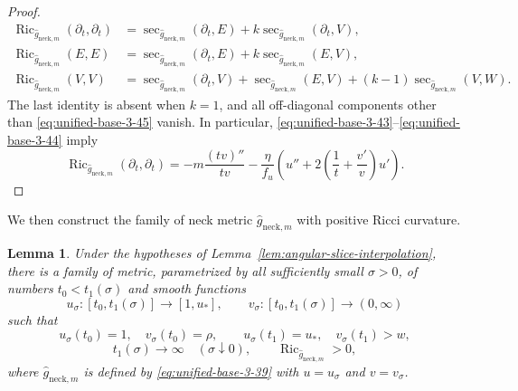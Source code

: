 \documentclass[11pt,reqno]{amsart}
\newtheorem{lemma}[theorem]{Lemma}
\theoremstyle{definition}
\numberwithin{equation}{section}
\DeclareMathOperator{\Ric}{Ric}
\begin{document}
\begin{proof}
\begin{equation}
\begin{aligned}
 \Ric_{\widehat g_{\mathrm{neck},m}}(\partial_t,\partial_t)
   &=\sec_{\widehat g_{\mathrm{neck},m}}(\partial_t,E)
     +k\sec_{\widehat g_{\mathrm{neck},m}}(\partial_t,V),\\
 \Ric_{\widehat g_{\mathrm{neck},m}}(E,E)
   &=\sec_{\widehat g_{\mathrm{neck},m}}(\partial_t,E)
     +k\sec_{\widehat g_{\mathrm{neck},m}}(E,V),\\
 \Ric_{\widehat g_{\mathrm{neck},m}}(V,V)
   &=\sec_{\widehat g_{\mathrm{neck},m}}(\partial_t,V)
     +\sec_{\widehat g_{\mathrm{neck},m}}(E,V)
     +(k-1)\sec_{\widehat g_{\mathrm{neck},m}}(V,W).
 \end{aligned}                                                     \label{eq:unified-base-3-46}
\end{equation}
The last identity is absent when $k=1$, and all off-diagonal components
other than \eqref{eq:unified-base-3-45} vanish.  In particular,
\eqref{eq:unified-base-3-43}--\eqref{eq:unified-base-3-44} imply
\begin{equation}
\Ric_{\widehat g_{\mathrm{neck},m}}(\partial_t,\partial_t)
 =-m\frac{(tv)''}{tv}
   -\frac{\eta}{f_u}\left(
       u''+2\left(\frac1t+\frac{v'}v\right)u'\right).           \label{eq:unified-base-3-47}
\end{equation}
\end{proof}
We then construct the family of neck metric $\widehat g_{\mathrm{neck},m}$ with positive Ricci curvature.
\begin{lemma}
\label{lem:slow-logarithmic-neck}
Under the hypotheses of
Lemma~\ref{lem:angular-slice-interpolation}, there is a family of metric,
parametrized by all sufficiently small \(\sigma>0\), of numbers
\(t_0<t_1(\sigma)\) and smooth functions
\[
 u_\sigma:[t_0,t_1(\sigma)]\longrightarrow[1,u_*],\qquad
 v_\sigma:[t_0,t_1(\sigma)]\longrightarrow(0,\infty)
\]
such that
\[
 u_\sigma(t_0)=1,\quad v_\sigma(t_0)=\rho,\qquad
 u_\sigma(t_1)=u_*,\quad v_\sigma(t_1)>w,
\]
\[
 t_1(\sigma)\longrightarrow\infty\quad(\sigma\downarrow0),
\qquad
\Ric_{\widehat g_{\mathrm{neck},m}}>0 ,
\]
where \(\widehat g_{\mathrm{neck},m}\) is defined by
\eqref{eq:unified-base-3-39} with
\(u=u_\sigma\) and \(v=v_\sigma\).
\end{lemma}
\end{document}
